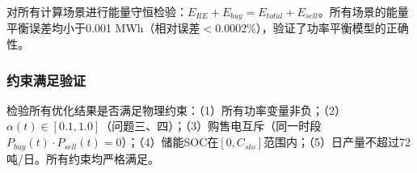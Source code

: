 对所有计算场景进行能量守恒检验：$E_{RE} + E_{buy} = E_{total} + E_{sell}$。所有场景的能量平衡误差均小于0.001 MWh（相对误差$<$0.0002\%），验证了功率平衡模型的正确性。

\subsubsection{约束满足验证}

检验所有优化结果是否满足物理约束：（1）所有功率变量非负；（2）$\alpha(t) \in [0.1, 1.0]$（问题三、四）；（3）购售电互斥（同一时段$P_{buy}(t) \cdot P_{sell}(t) = 0$）；（4）储能SOC在$[0, C_{sto}]$范围内；（5）日产量不超过72吨/日。所有约束均严格满足。